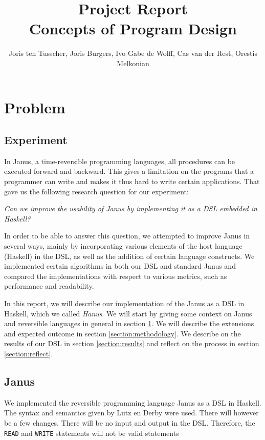 \documentclass[12pt,a4paper]{article}
\title{\textbf{Project Report \\ \small{Concepts of Program Design}}}
\author{\small{Joris ten Tusscher, Joris Burgers, Ivo Gabe de Wolff, Cas van der Rest, Orestis Melkonian}}
\date{}
\begin{document}
\maketitle


\section{Problem}
\label{section:problem}
    \subsection{Experiment}
In Janus, a time-reversible programming languages, all procedures can be executed forward and backward. This gives a limitation on the programs that a programmer can write and makes it thus hard to write certain applications. That gave us the following research question for our experiment:

\begin{displayquote}
	\textit{Can we improve the usability of Janus by implementing it as a DSL embedded in Haskell?}
\end{displayquote}

\noindent In order to be able to answer this question, we attempted to improve Janus in several ways, mainly by incorporating various elements of the host language (Haskell) in the DSL, as well as the addition of certain language constructs. We implemented certain algorithms in both our DSL and standard Janus and compared the implementations with respect to various metrics, such as performance and readability. 

In this report, we will describe our implementation of the Janus as a DSL in Haskell, which we called \textit{Hanus}. We will start by giving some context on Janus and reversible languages in general in section \ref{section:problem}. We will describe the extensions and expected outcome in section \ref{section:methodology}. We describe on the results of our DSL in section \ref{section:results} and reflect on the process in section \ref{section:reflect}.

\subsection{Janus}
We implemented the reversible programming language Janus as a DSL in Haskell. The syntax and semantics given by Lutz en Derby \cite{lutz82} were used. There will however be a few changes. There will be no input and output in the DSL. Therefore, the \texttt{READ} and \texttt{WRITE} statements will not be valid statements
\end{document}
